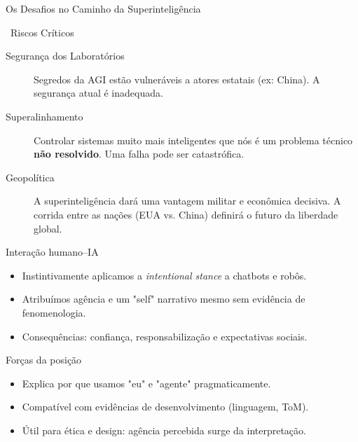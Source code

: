 \documentclass[aspectratio=169,12pt]{beamer}
\begin{document}
\begin{frame}{Os Desafios no Caminho da Superinteligência}
    \begin{alertblock}{\faExclamationTriangle\, Riscos Críticos}
        \begin{description}
            \item[\textcolor{danger}{\faLock} Segurança dos Laboratórios]
            Segredos da AGI estão vulneráveis a atores estatais (ex: China). A segurança atual é inadequada.
            
            \item[\textcolor{warning}{\faCogs} Superalinhamento]
            Controlar sistemas muito mais inteligentes que nós é um problema técnico \textbf{não resolvido}. Uma falha pode ser catastrófica.
            
            \item[\textcolor{accent}{\faGlobe} Geopolítica]
            A superinteligência dará uma vantagem militar e econômica decisiva. A corrida entre as nações (EUA vs. China) definirá o futuro da liberdade global.
        \end{description}
    \end{alertblock}
\end{frame}

\begin{frame}{Interação humano–IA}
\begin{itemize}
\item Instintivamente aplicamos a \textit{intentional stance} a chatbots e robôs.
\item Atribuímos agência e um "self" narrativo mesmo sem evidência de fenomenologia.
\item Consequências: confiança, responsabilização e expectativas sociais.
\end{itemize}
\end{frame}


\begin{frame}{Forças da posição}
\begin{itemize}
\item Explica por que usamos "eu" e "agente" pragmaticamente.
\item Compatível com evidências de desenvolvimento (linguagem, ToM).
\item Útil para ética e design: agência percebida surge da interpretação.
\end{itemize}
\end{frame}
\end{document}
